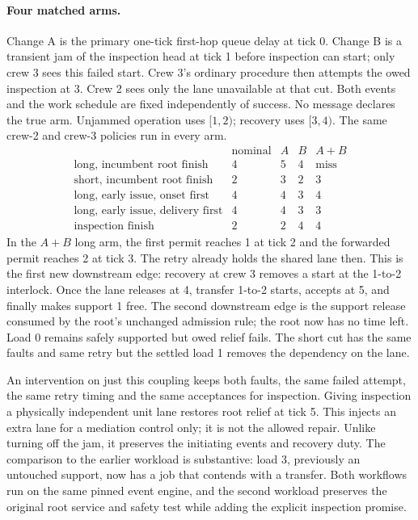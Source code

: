 \documentclass[11pt]{article}
\begin{document}
\paragraph{Four matched arms.}
Change A is the primary one-tick first-hop queue delay at tick 0. Change B is a transient jam of the inspection head at tick 1 before inspection can start; only crew 3 sees this failed start. Crew 3's ordinary procedure then attempts the owed inspection at 3. Crew 2 sees only the lane unavailable at that cut. Both events and the work schedule are fixed independently of success. No message declares the true arm. Unjammed operation uses $[1,2)$; recovery uses $[3,4)$. The same crew-2 and crew-3 policies run in every arm.
\[
\begin{array}{c|rrrr}
&\text{nominal}&A&B&A+B\\\hline
\text{long, incumbent root finish}&4&5&4&\text{miss}\\
\text{short, incumbent root finish}&2&3&2&3\\
\text{long, early issue, onset first}&4&4&3&4\\
\text{long, early issue, delivery first}&4&4&3&3\\
\text{inspection finish}&2&2&4&4
\end{array}
\]
In the $A+B$ long arm, the first permit reaches 1 at tick 2 and the forwarded permit reaches 2 at tick 3. The retry already holds the shared lane then. This is the first new downstream edge: recovery at crew 3 removes a start at the 1-to-2 interlock. Once the lane releases at 4, transfer 1-to-2 starts, accepts at 5, and finally makes support 1 free. The second downstream edge is the support release consumed by the root's unchanged admission rule; the root now has no time left. Load 0 remains safely supported but owed relief fails. The short cut has the same faults and same retry but the settled load 1 removes the dependency on the lane.

An intervention on just this coupling keeps both faults, the same failed attempt, the same retry timing and the same acceptances for inspection. Giving inspection a physically independent unit lane restores root relief at tick 5. This injects an extra lane for a mediation control only; it is not the allowed repair. Unlike turning off the jam, it preserves the initiating events and recovery duty. The comparison to the earlier workload is substantive: load 3, previously an untouched support, now has a job that contends with a transfer. Both workflows run on the same pinned event engine, and the second workload preserves the original root service and safety test while adding the explicit inspection promise.
\end{document}
